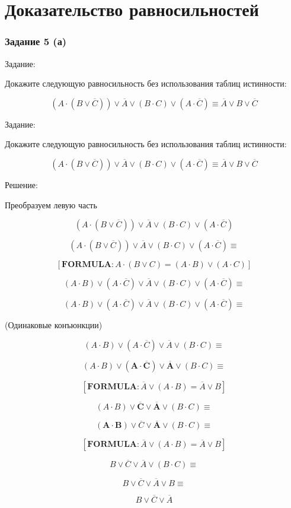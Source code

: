 \documentclass[10pt]{beamer}
\theoremstyle{remark}
\theoremstyle{definition}
\begin{document}
\section{Доказательство равносильностей}
\begin{frame}[allowframebreaks]
\frametitle{Задание 5 (а)}

Задание: 

Докажите следующую равносильность без использования таблиц истинности: 

$$ (A \cdot (B \vee \overline{C})) \vee \overline{A} \vee (B \cdot C) \vee (A \cdot \overline{C}) \equiv \overline{A} \vee B \vee \overline{C} $$

\framebreak

Задание: 

Докажите следующую равносильность без использования таблиц истинности: 

$$ (A \cdot (B \vee \overline{C})) \vee \overline{A} \vee (B \cdot C) \vee (A \cdot \overline{C}) \equiv \overline{A} \vee B \vee \overline{C} $$

Решение: 

Преобразуем левую часть

$$(A \cdot (B \vee \overline{C})) \vee \overline{A} \vee (B \cdot C) \vee (A \cdot \overline{C}) $$

\framebreak

$$(A \cdot (B \vee \overline{C})) \vee \overline{A} \vee (B \cdot C) \vee (A \cdot \overline{C}) \equiv $$

$$[ \boldsymbol{FORMULA:}  A \cdot (B \vee C) = (A \cdot B) \vee (A \cdot C) ] $$


$$(A \cdot B) \vee (A \cdot \overline{C}) \vee \overline{A} \vee (B \cdot C) \vee (A \cdot \overline{C}) \equiv $$

\framebreak

$$(A \cdot B) \vee (A \cdot \overline{C}) \vee \overline{A} \vee (B \cdot C) \vee (A \cdot \overline{C}) \equiv $$

(Одинаковые конъюнкции)

$$(A \cdot B) \vee (A \cdot \overline{C}) \vee \overline{A} \vee (B \cdot C) \equiv $$

\framebreak

$$(A \cdot B) \vee \boldsymbol{(A \cdot \overline{C}) \vee \overline{A}} \vee (B \cdot C) \equiv $$

$$[ \boldsymbol{FORMULA:}  \overline{A} \vee (A \cdot B) = \overline{A} \vee B ]$$

$$(A \cdot B) \vee \boldsymbol{\overline{C} \vee \overline{A}} \vee (B \cdot C) \equiv $$

\framebreak 

$$\boldsymbol{(A \cdot B)} \vee \overline{C} \vee \boldsymbol{\overline{A}} \vee (B \cdot C) \equiv $$

$$[ \boldsymbol{FORMULA:} \overline{A} \vee (A \cdot B) = \overline{A} \vee B ]$$

$$B \vee \overline{C} \vee \overline{A} \vee (B \cdot C) \equiv $$


$$B \vee \overline{C} \vee \overline{A} \vee B \equiv $$

$$B \vee \overline{C} \vee \overline{A} $$

\end{frame}
\end{document}
